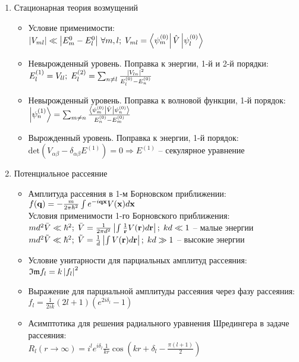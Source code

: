 \begin{enumerate}[label=\textbf{\underline{\arabic*.}}]
\item Стационарная теория возмущений  \begin{itemize}
            \item Условие применимости: \\
            $ \abs{V_{ml}} \ll \abs{E_m^0 - E_l^0}\, \forall m,l;\; V_{ml}=\matrixel{\psi_m^{(0)}}{\hat{V}}{\psi_l^{(0)}} $
            \item Невырожденный уровень. Поправка к энергии, 1-й и 2-й порядки: \\
            $ E_l^{(1)} = V_{ll};\; E_l^{(2)} = \sum_{n \neq l} \frac{\left| V_{ln} \right|^2}{E_l^{(0)} - E_n^{(0)}} $
            \item Невырожденный уровень. Поправка к волновой функции, 1-й порядок: \\
            $ \ket{\psi_n^{(1)}} = \sum_{m \neq n} \frac{\matrixel{\psi_m^{(0)}}{\hat{V}}{\psi_n^{(0)}}}{E_n^{(0)} - E_m^{(0)}} $
            \item Вырожденный уровень. Поправка к энергии, 1-й порядок: \\
            $ \text{det}(V_{\alpha\beta} - \delta_{\alpha\beta}E^{(1)})=0 \Rightarrow E^{(1)} $ -- секулярное уравнение

        \end{itemize}
\item Потенциальное рассеяние  \begin{itemize}
            \item Амплитуда рассеяния в 1-м Борновском приближении: \\
            $ f(\mathbf{q}) = -\frac{m}{2\pi\hbar^2}\int e^{-i\mathbf{q}\mathbf{x}} V(\mathbf{x})d\mathbf{x} $ \\
            Условия применимости 1-го Борновского приближения: \\
            $ md^2\bar{V} \ll \hbar^2;\; \bar{V} = \frac1{2\pi d^2} \left| \int \frac1{\mathbf{r}}V(\mathbf{r})d\mathbf{r} \right|;\; kd \ll 1 $ -- малые энергии \\
            $ md^2\tilde{V} \ll \hbar^2;\; \tilde{V} = \frac1{d} \left| \int V(\mathbf{r})d\mathbf{r} \right|;\; kd \gg 1 $ -- высокие энергии \\
            \item Условие унитарности для парциальных амплитуд рассеяния: \\
            $ \mathfrak{Im}{f_l} = k \left| f_l \right|^2 $
            \item Выражение для парциальной амплитуды рассеяния через фазу рассеяния: \\
            $ f_l = \frac1{2ik}(2l+1)(e^{2i\delta_l} - 1) $
            \item Асимптотика для решения радиального уравнения Шредингера в задаче рассеяния: \\
            $ R_l(r \rightarrow \infty) = i^l e^{i\delta_l} \frac1{kr} \cos(kr+\delta_l - \frac{\pi(l+1)}{2}) $


\end{itemize}
\end{enumerate}
